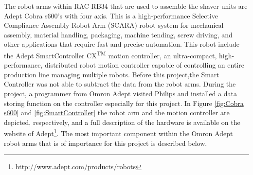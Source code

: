 The robot arms within RAC RB34 that are used to assemble the shaver units are Adept Cobra s600's with four axis. This is a high-performance Selective Compliance Assembly Robot Arm (SCARA) robot system for mechanical assembly, material handling, packaging, machine tending, screw driving, and other applications that require fast and precise automation. This robot include the Adept SmartController CX\textsuperscript{\tiny{TM}} motion controller, an ultra-compact, high-performance, distributed robot motion controller capable of controlling an entire production line managing multiple robots. Before this project,the Smart Controller was not able to subtract the data from the robot arms. During the project, a programmer from Omron Adept visited Philips and installed a data storing function on the controller especially for this project. In Figure \ref{fig:Cobra s600} and \ref{fig:SmartController} the robot arm and the motion controller are depicted, respectively, and a full description of the hardware is available on the website of Adept\footnote{http://www.adept.com/products/robots}. The most important component within the Omron Adept robot arms that is of importance for this project is described below.

